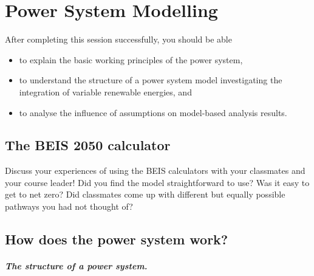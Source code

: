 \setchapterpreamble[u]{\margintoc}
\chapter{Power System Modelling}

After completing this session successfully, you should be able

\begin{itemize}
\item to explain the basic working principles of the power system,
\item to understand the structure of a power system model investigating the integration of variable renewable energies, and
\item  to analyse the influence of assumptions on model-based analysis results.
    
\end{itemize}

\section{The BEIS 2050 calculator}


\begin{kaobox}[frametitle=Task]
Discuss your experiences of using the BEIS calculators with your classmates and your course leader! Did you find the model straightforward to use? Was it easy to get to net zero? Did classmates come up with different but equally possible pathways you had not thought of?
\end{kaobox}

\section{How does the power system work?}


\paragraph*{The structure of a power system.}

